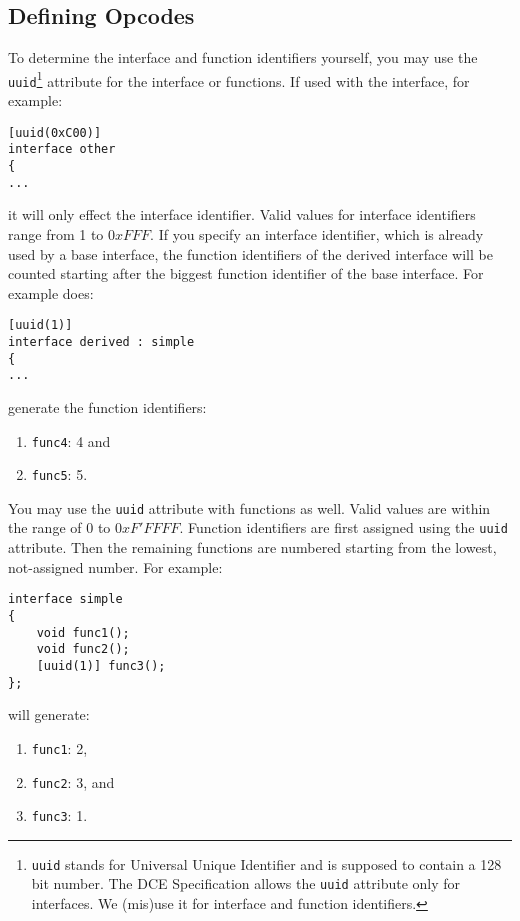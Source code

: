 \subsection{Defining Opcodes}
\label{sec:uuid}
To determine the interface and function identifiers yourself,
you may use the \verb|uuid|\footnote{{\tt uuid} stands for Universal
Unique Identifier and is supposed to contain a 128 bit number. The DCE
Specification allows the {\tt uuid} attribute only for interfaces. We
(mis)use it for interface and function identifiers.} attribute for the 
interface or functions. If used with the interface, for example:

\begin{verbatim}
[uuid(0xC00)]
interface other
{
...
\end{verbatim}

it will only effect the interface identifier. Valid values for interface 
identifiers range from 1 to $0xFFF$. If you specify an interface
identifier, which is already used by a base interface, the function
identifiers of the derived interface will be counted starting
after the biggest function identifier of the base interface. For example does:

\begin{verbatim}
[uuid(1)]
interface derived : simple
{
...
\end{verbatim}

generate the function identifiers:

\begin{enumerate}
\item \verb|func4|: 4 and
\item \verb|func5|: 5.
\end{enumerate}

You may use the \verb|uuid| attribute with functions as
well. Valid values are within the range of $0$ to $0xF'FFFF$. 
Function identifiers are first assigned
using the \verb|uuid| attribute. Then the remaining functions are
numbered starting from the lowest, not-assigned number. For example:

\begin{verbatim}
interface simple
{
    void func1();
    void func2();
    [uuid(1)] func3();
};
\end{verbatim}

will generate:

\begin{enumerate}
\item \verb|func1|: 2,
\item \verb|func2|: 3, and
\item \verb|func3|: 1.
\end{enumerate}


